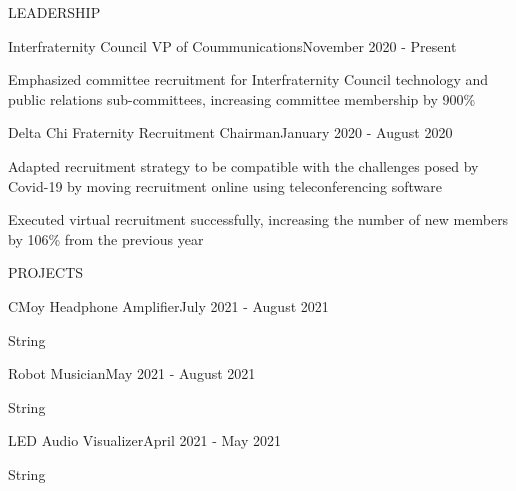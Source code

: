 \documentclass{resume}
\begin{document}
\begin{rSection}{LEADERSHIP}
	\begin{rSubsection}{Interfraternity Council VP of Coummunications}{November 2020 - Present}{}{}{}
		\item Emphasized committee recruitment for Interfraternity Council technology and public relations sub-committees, increasing committee membership by 900\%
	\end{rSubsection}
	\begin{rSubsection}{Delta Chi Fraternity Recruitment Chairman}{January 2020 - August 2020}{}{}{}
		\item Adapted recruitment strategy to be compatible with the challenges posed by Covid-19 by moving recruitment online using teleconferencing software
		\item Executed virtual recruitment successfully, increasing the number of new members by 106\% from the previous year
	\end{rSubsection}
\end{rSection}
\begin{rSection}{PROJECTS}
	\begin{rSubsection}{CMoy Headphone Amplifier}{July 2021 - August 2021}{}{}{}
		\item String
	\end{rSubsection}
	\begin{rSubsection}{Robot Musician}{May 2021 - August 2021}{}{}{}
		\item String
	\end{rSubsection}
	\begin{rSubsection}{LED Audio Visualizer}{April 2021 - May 2021}{}{}{}
		\item String
	\end{rSubsection}
\end{rSection}
\end{document}
